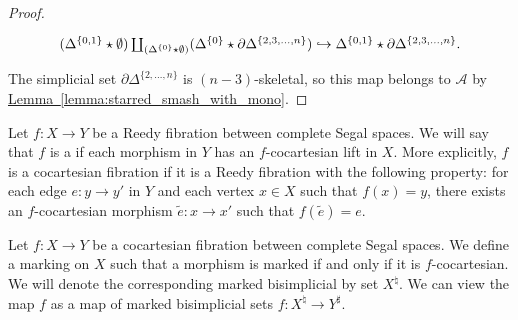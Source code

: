 \documentclass[main.tex]{subfiles}
\begin{document}
\begin{proof}
  \begin{equation*}
    \begin{tikzcd}
      (\Delta^{\{0, 1\}} \star \emptyset) \coprod_{(\Delta^{\{0\}} \star \emptyset)} (\Delta^{\{0\}} \star \partial \Delta^{\{2, 3, \ldots, n\}}) \hookrightarrow \Delta^{\{0, 1\}} \star \partial \Delta^{\{2, 3, \ldots, n\}}.
    \end{tikzcd}
  \end{equation*}
  The simplicial set $\partial \Delta^{\{2, \ldots, n\}}$ is $(n-3)$-skeletal, so this map belongs to $\mathcal{A}$ by \hyperref[lemma:starred_smash_with_mono]{Lemma~\ref*{lemma:starred_smash_with_mono}}.
\end{proof}

\begin{definition}
  \label{def:cocartesian_fibration_between_complete_segal_spaces}
  Let $f\colon X \to Y$ be a Reedy fibration between complete Segal spaces. We will say that $f$ is a  if each morphism in $Y$ has an $f$-cocartesian lift in $X$. More explicitly, $f$ is a cocartesian fibration if it is a Reedy fibration with the following property: for each edge $e\colon y \to y'$ in $Y$ and each vertex $x \in X$ such that $f(x) = y$, there exists an $f$-cocartesian morphism $\tilde{e}\colon x \to x'$ such that $f(\tilde{e}) = e$.
\end{definition}

\begin{definition}
  \label{def:cocoartesian_marking_on_complete_segal_spaces}
  Let $f\colon X \to Y$ be a cocartesian fibration between complete Segal spaces. We define a marking on $X$ such that a morphism is marked if and only if it is $f$-cocartesian. We will denote the corresponding marked bisimplicial by set $X^{\natural}$. We can view the map $f$ as a map of marked bisimplicial sets $f\colon X^{\natural} \to Y^{\sharp}$.
\end{definition}
\end{document}
